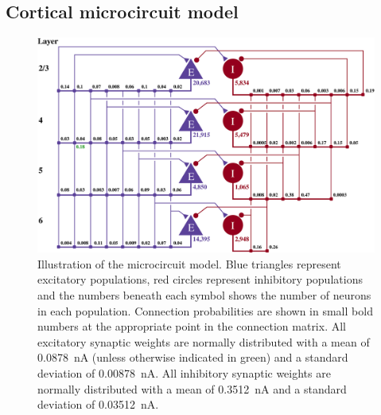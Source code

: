 \documentclass[utf8]{frontiersSCNS} %
\begin{document}
\subsection{Cortical microcircuit model}
\label{sec:method/microcircuit}

\begin{figure}
    \begin{center}
        \includegraphics[width=180mm]{figures/potjans_circuit_v2}
    \end{center}
    \caption{Illustration of the microcircuit model.
    Blue triangles represent excitatory populations, red circles represent inhibitory populations and the numbers beneath each symbol shows the number of neurons in each population.
    Connection probabilities are shown in small bold numbers at the appropriate point in the connection matrix.
    All excitatory synaptic weights are normally distributed with a mean of \SI{0.0878}{\nano\ampere} (unless otherwise indicated in green) and a standard deviation of \SI{0.00878}{\nano\ampere}.
    All inhibitory synaptic weights are normally distributed with a mean of \SI{0.3512}{\nano\ampere} and a standard deviation of \SI{0.03512}{\nano\ampere}.}
    \label{fig:potjans_circuit}
\end{figure}
\end{document}
